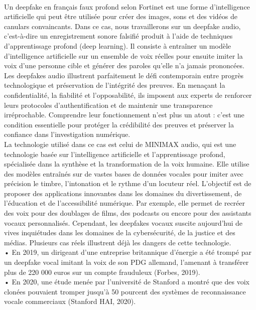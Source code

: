 \documentclass[]{article}
\begin{document}
\paragraph{}
Un deepfake en français faux profond selon Fortinet est une forme d’intelligence artificielle qui peut être utilisée pour créer des images, sons et des vidéos de canulars convaincants. Dans ce cas, nous travaillerons sur un deepfake audio, c’est-à-dire un enregistrement sonore falsifié produit à l’aide de techniques d’apprentissage profond (deep learning). Il consiste à entraîner un modèle d’intelligence artificielle sur un ensemble de voix réelles pour ensuite imiter la voix d’une personne cible et générer des paroles qu’elle n’a jamais prononcées. Les deepfakes audio illustrent parfaitement le défi contemporain entre progrès technologique et préservation de l’intégrité des preuves. En menaçant la confidentialité, la fiabilité et l’opposabilité, ils imposent aux experts de renforcer leurs protocoles d’authentification et de maintenir une transparence irréprochable. Comprendre leur fonctionnement n’est plus un atout : c’est une condition essentielle pour protéger la crédibilité des preuves et préserver la confiance dans l’investigation numérique.\\
La technologie utilisé dans ce cas est celui de MINIMAX audio, qui est une technologie basée sur l’intelligence artificielle et l’apprentissage profond, spécialisée dans la synthèse et la transformation de la voix humaine. Elle utilise des modèles entraînés sur de vastes bases de données vocales pour imiter avec précision le timbre, l’intonation et le rythme d’un locuteur réel. L’objectif est de proposer des applications innovantes dans les domaines du divertissement, de l’éducation et de l’accessibilité numérique. Par exemple, elle permet de recréer des voix pour des doublages de films, des podcasts ou encore pour des assistants vocaux personnalisés.
Cependant, les deepfakes vocaux suscite aujourd’hui de vives inquiétudes dans les domaines
de la cybersécurité, de la justice et des médias. Plusieurs cas réels illustrent déjà les dangers de cette technologie.\\
•	En 2019, un dirigeant d’une entreprise britannique d’énergie a été trompé par un deepfake vocal imitant la voix de son PDG allemand, l’amenant à transférer plus de 220 000 euros sur un compte frauduleux (Forbes, 2019).\\
•	En 2020, une étude menée par l’université de Stanford a montré que des voix clonées pouvaient tromper jusqu’à 50 pourcent des systèmes de reconnaissance vocale commerciaux (Stanford HAI, 2020).\\
\end{document}
